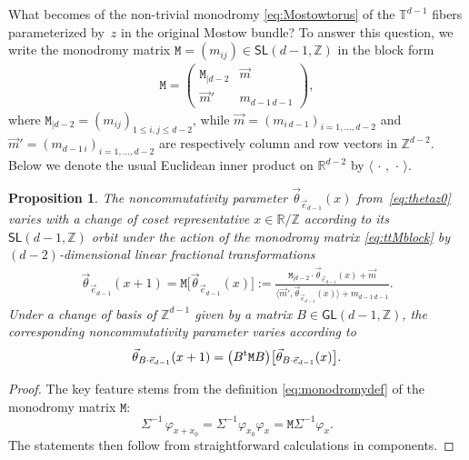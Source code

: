 \documentclass[10pt,a4paper]{amsart}
\numberwithin{equation}{section}
\newcommand{\Z}{\zed}
\newcommand{\sfGL}{\mathsf{GL}}
\newcommand{\sfSL}{\mathsf{SL}}
\newcommand{\ttM}{\mathtt{M}}
\newcommand{\R}{\real}
\newcommand{\zed}{{\mathbb Z}} %
\newcommand{\real}{{\mathbb R}} %
\newcommand{\torus}{{\mathbb T}} %
\newtheorem{Proposition}[Theorem]{Proposition}
 { \theoremstyle{definition}
\newtheorem{Definition}[Theorem]{Definition}
\newtheorem{Note}[Theorem]{Note}
\newtheorem{Example}[Theorem]{Example}
\newtheorem{Remark}[Theorem]{Remark} }
\begin{document}
What becomes of the non-trivial monodromy \eqref{eq:Mostowtorus} of
the $\torus^{d-1}$ fibers parameterized by~$z$ in the original Mostow
bundle? To answer this question, we write the monodromy matrix
$\ttM=(m_{ij})\in\sfSL(d-1,\Z)$ in the block form
\begin{gather}\label{eq:ttMblock}
\ttM = \left(\begin{matrix} \ttM_{|d-2} & \vec m \\
\vec m' & m_{d-1 \, d-1}
\end{matrix}\right) ,
\end{gather}
where $\ttM_{|d-2}=(m_{ij})_{1\leq i,j\leq d-2}$, while $\vec m=(m_{i \,
 d-1})_{i=1,\dots,d-2}$ and $\vec m' = (m_{d-1 \,
 i})_{i=1,\dots,d-2}$ are respectively column and row vectors in $\Z^{d-2}$. Below
we denote the usual Euclidean inner product on $\R^{d-2}$ by
$\langle\,\cdot\,,\,\cdot\,\rangle$.
\begin{Proposition}\label{prop:monodromyprop}
The noncommutativity parameter
$\vec\theta_{\vec e_{d-1}}(x)$ from~\eqref{eq:thetaz0} varies with a
change of coset representative $x\in\R/\Z$ according to its
$\sfSL(d-1,\Z)$ orbit under the action of the monodromy matrix
\eqref{eq:ttMblock} by $(d{-}2)$-dimensional linear fractional transformations
\begin{gather}\label{eq:thetaMoritagen}
\vec\theta_{\vec e_{d-1}}(x+1) = \ttM\big[\vec\theta_{\vec
 e_{d-1}}(x)\big] :=
\frac{\ttM_{|d-2}\cdot\vec\theta_{\vec e_{d-1}}(x) + \vec m}
{\big\langle \vec m',\vec\theta_{\vec e_{d-1}}(x)\big\rangle + m_{d-1 \,
 d-1}} .
\end{gather}
Under a change of basis of $\Z^{d-1}$ given
by a matrix $B\in\sfGL(d-1,\Z)$, the corresponding noncommutativity
parameter varies according to
\[
\vec\theta_{B\cdot\vec e_{d-1}}(x+1) = \big(B^{\rm
 t} \ttM B\big)\big[\vec\theta_{B\cdot\vec e_{d-1}}(x)\big] .
\]
\end{Proposition}
\begin{proof}
The key feature stems from the definition \eqref{eq:monodromydef} of the monodromy matrix
$\ttM$:
\[
\Sigma^{-1}\,\varphi_{x+x_0} = \Sigma^{-1} \varphi_{x_0} \varphi_x =
\ttM \Sigma^{-1} \varphi_x .
\]
The statements then follow from straightforward calculations in components.
\end{proof}
\end{document}
